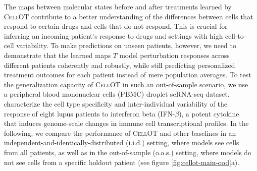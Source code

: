 The maps between molecular states before and after treatments learned by \textsc{CellOT} contribute to a better understanding of the differences between cells that respond to certain drugs and cells that do not respond. This is crucial for inferring an incoming patient's response to drugs and settings with high cell-to-cell variability.
To make predictions on unseen patients, however, we need to demonstrate that the learned maps $T$ model perturbation responses across different patients coherently and robustly, while still predicting personalized treatment outcomes for each patient instead of mere population averages.
To test the generalization capacity of \textsc{CellOT} in such an out-of-sample scenario, we use a peripheral blood mononuclear cells (PBMC) droplet scRNA-seq dataset. \citet{kang2018multiplexed} characterize the cell type specificity and inter-individual variability of the response of eight lupus patients to interferon beta (IFN-$\beta$), a potent cytokine that induces genome-scale changes in immune cell transcriptional profiles.
In the following, we compare the performance of \textsc{CellOT} and other baselines in an independent-and-identically-distributed (i.i.d.) setting, where models see cells from all patients, as well as in the out-of-sample (o.o.s.) setting, where models do not see cells from a specific holdout patient (see figure \ref{fig:cellot-main-ood}a).

